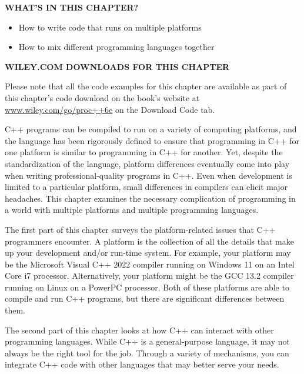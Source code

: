 \noindent
\textbf{WHAT’S IN THIS CHAPTER?}

\begin{itemize}
\item
How to write code that runs on multiple platforms

\item
How to mix different programming languages together
\end{itemize}

\noindent
\textbf{WILEY.COM DOWNLOADS FOR THIS CHAPTER}

Please note that all the code examples for this chapter are available as part of this chapter’s code download on the book’s website at \url{www.wiley.com/go/proc++6e} on the Download Code tab.

C++ programs can be compiled to run on a variety of computing platforms, and the language has been rigorously defined to ensure that programming in C++ for one platform is similar to programming in C++ for another. Yet, despite the standardization of the language, platform differences eventually come into play when writing professional-quality programs in C++. Even when development is limited to a particular platform, small differences in compilers can elicit major headaches. This chapter examines the necessary complication of programming in a world with multiple platforms and multiple programming languages.

The first part of this chapter surveys the platform-related issues that C++ programmers encounter. A platform is the collection of all the details that make up your development and/or run-time system. For example, your platform may be the Microsoft Visual C++ 2022 compiler running on Windows 11 on an Intel Core i7 processor. Alternatively, your platform might be the GCC 13.2 compiler running on Linux on a PowerPC processor. Both of these platforms are able to compile and run C++ programs, but there are significant differences between them.

The second part of this chapter looks at how C++ can interact with other programming languages. While C++ is a general-purpose language, it may not always be the right tool for the job. Through a variety of mechanisms, you can integrate C++ code with other languages that may better serve your needs.

